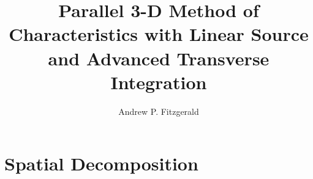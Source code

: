 \documentclass[thesis]{prospectus-umich}
\title{Parallel 3-D Method of Characteristics with Linear Source and Advanced Transverse Integration}
\author{Andrew P. Fitzgerald}
\begin{document}
    \acresetall

    
    
    
    
    
    \printbibliography
    \appendix
        \chapter{Spatial Decomposition}{\label{ch:Spatial Decomposition in MPACT}
            
        }
\end{document}
